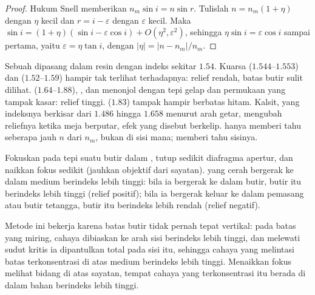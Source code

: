 \begin{proof}
Hukum Snell memberikan $n_m \sin i = n \sin r$. Tulislah $n = n_m(1 + \eta)$ dengan
$\eta$ kecil dan $r = i - \varepsilon$ dengan $\varepsilon$ kecil. Maka
$\sin i = (1 + \eta)(\sin i - \varepsilon\cos i) + O(\eta^2, \varepsilon^2)$,
sehingga $\eta \sin i = \varepsilon\cos i$ sampai  pertama, yaitu
$\varepsilon = \eta\tan i$, dengan $|\eta| = |n - n_m|/n_m$.
\end{proof}

Sebuah  dipasang dalam resin dengan indeks sekitar $1.54$.
Kuarsa ($1.544$--$1.553$) dan  ($1.52$--$1.59$) hampir tak terlihat terhadapnya: relief rendah, batas butir sulit dilihat.  ($1.64$--$1.88$), , dan  menonjol dengan tepi gelap dan permukaan yang tampak kasar: relief tinggi.  ($1.83$) tampak hampir berbatas hitam. Kalsit, yang indeksnya berkisar dari $1.486$ hingga $1.658$ menurut arah getar, mengubah reliefnya ketika meja berputar, efek yang disebut berkelip.
 hanya memberi tahu seberapa jauh $n$ dari $n_m$, bukan di sisi mana;  memberi tahu sisinya.

\begin{method}\label{met:b1:optical-mineralogy:becke}
Fokuskan pada tepi suatu butir dalam , tutup sedikit diafragma apertur, dan naikkan fokus sedikit (jauhkan objektif dari sayatan).  yang cerah bergerak ke dalam medium berindeks lebih tinggi: bila ia bergerak ke dalam butir, butir itu berindeks lebih tinggi (relief positif); bila ia bergerak keluar ke dalam pemasang atau butir tetangga, butir itu berindeks lebih rendah (relief negatif).
\end{method}

Metode ini bekerja karena batas butir tidak pernah tepat vertikal: pada batas yang miring, cahaya dibiaskan ke arah sisi berindeks lebih tinggi, dan melewati sudut kritis ia dipantulkan total pada sisi itu, sehingga cahaya yang melintasi batas terkonsentrasi di atas medium berindeks lebih tinggi. Menaikkan fokus melihat bidang di atas sayatan, tempat cahaya yang terkonsentrasi itu berada di dalam bahan berindeks lebih tinggi.

